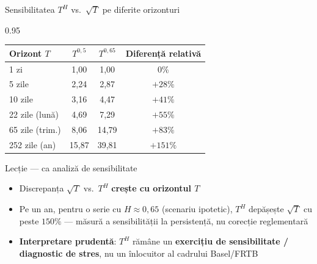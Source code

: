 \documentclass[9pt, aspectratio=169, t]{beamer}
\begin{document}
\begin{frame}[shrink=15]{Sensibilitatea $T^H$ vs.\ $\sqrt T$ pe diferite orizonturi}
\begin{cminipage}{0.95\textwidth}
\renewcommand{\arraystretch}{1.2}
\centering
\small
\begin{tabular}{lccc}
\toprule
\textbf{Orizont $T$} & \textbf{$T^{0{,}5}$} & \textbf{$T^{0{,}65}$} & \textbf{Diferență relativă} \\
\midrule
1 zi & 1,00 & 1,00 & 0\% \\
5 zile & 2,24 & 2,87 & $+28\%$ \\
10 zile & 3,16 & 4,47 & $+41\%$ \\
22 zile (lună) & 4,69 & 7,29 & $+55\%$ \\
65 zile (trim.) & 8,06 & 14,79 & $+83\%$ \\
252 zile (an) & 15,87 & 39,81 & $+151\%$ \\
\bottomrule
\end{tabular}
\vspace{0.15cm}
\begin{exampleblock}{Lecție --- ca analiză de sensibilitate}
\begin{itemize}\setlength{\itemsep}{0pt}
    \item Discrepanța $\sqrt T$ vs.\ $T^H$ \textbf{crește cu orizontul $T$}
    \item Pe un an, pentru o serie cu $H\approx 0{,}65$ (scenariu ipotetic), $T^H$ depășește $\sqrt T$ cu peste $150\%$ --- măsură a sensibilității la persistență, nu corecție reglementară
    \item \textbf{Interpretare prudentă}: $T^H$ rămâne un \textbf{exercițiu de sensibilitate / diagnostic de stres}, nu un înlocuitor al cadrului Basel/FRTB
\end{itemize}
\end{exampleblock}
\end{cminipage}
\end{frame}
\end{document}
